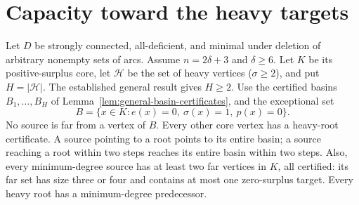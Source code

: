 \section{Capacity toward the heavy targets}
\label{sec:minimum-heavy-capacity}

Let $D$ be strongly connected, all-deficient, and minimal under
deletion of arbitrary nonempty sets of arcs.  Assume
$n=2\delta+3$ and $\delta\ge6$.
Let $K$ be its positive-surplus core, let $\mathcal H$ be the set of
heavy vertices ($\sigma\ge2$), and put $H=|\mathcal H|$.
The established general result gives $H\ge2$.
Use the certified basins $B_1,\ldots,B_H$ of
Lemma~\ref{lem:general-basin-certificates}, and the exceptional set
\[
 B=\{x\in K:e(x)=0,\ \sigma(x)=1,\ p(x)=0\}.
\]
No source is far from a vertex of $B$.  Every other core vertex
has a heavy-root certificate.  A source pointing to a root points
to its entire basin; a source reaching a root within two steps
reaches its entire basin within two steps.
Also, every minimum-degree source has at least two far vertices
in $K$, all certified: its far set has size three or four and
contains at most one zero-surplus target.
Every heavy root has a minimum-degree predecessor.

